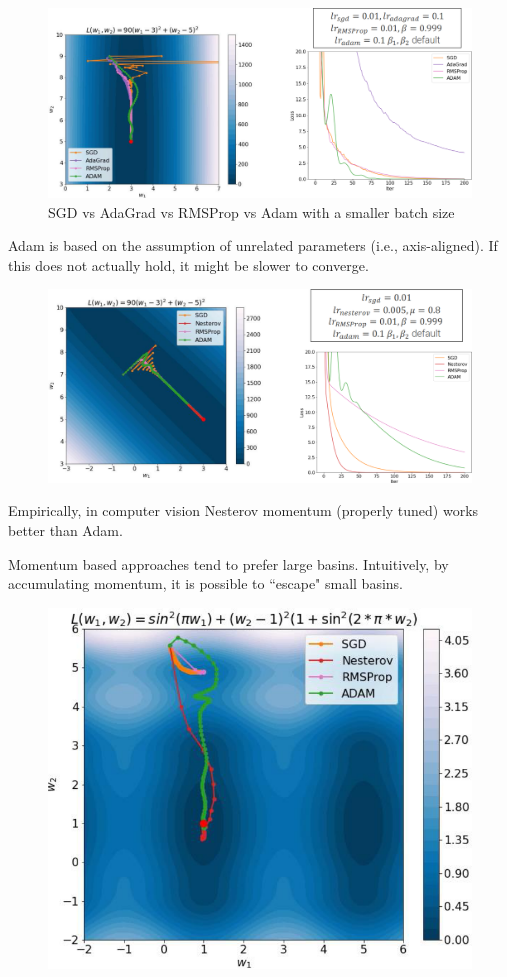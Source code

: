 \begin{description}
        \begin{figure}[H]
            \centering
            \includegraphics[width=0.75\linewidth]{./img/adam_noisy.png}
            \caption{SGD vs AdaGrad vs RMSProp vs Adam with a smaller batch size}
        \end{figure}

        \begin{remark}
            Adam is based on the assumption of unrelated parameters (i.e., axis-aligned). If this does not actually hold, it might be slower to converge.

            \begin{figure}[H]
                \centering
                \includegraphics[width=0.8\linewidth]{./img/optimizers_no_align.png}
            \end{figure}
        \end{remark}
\end{description}

\begin{remark}
    Empirically, in computer vision Nesterov momentum (properly tuned) works better than Adam.
\end{remark}

\begin{remark}
    Momentum based approaches tend to prefer large basins. Intuitively, by accumulating momentum, it is possible to ``escape" small basins.

    \begin{figure}[H]
        \centering
        \includegraphics[width=0.35\linewidth]{./img/momentum_local_global.png}
    \end{figure}
\end{remark}


